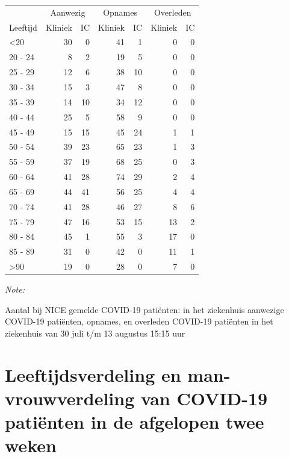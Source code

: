 \documentclass[
  english,
  man,floatsintext]{apa6}
\begin{document}
\begin{table}
\centering\begingroup\fontsize{10}{12}\selectfont

\begin{threeparttable}
\begin{tabular}{lrrrrrr}
\toprule
\multicolumn{1}{c}{ } & \multicolumn{2}{c}{Aanwezig} & \multicolumn{2}{c}{Opnames} & \multicolumn{2}{c}{Overleden} \\
\cmidrule(l{3pt}r{3pt}){2-3} \cmidrule(l{3pt}r{3pt}){4-5} \cmidrule(l{3pt}r{3pt}){6-7}
Leeftijd & Kliniek & IC & Kliniek & IC & Kliniek & IC\\
\midrule
<20 & 30 & 0 & 41 & 1 & 0 & 0\\
20 - 24 & 8 & 2 & 19 & 5 & 0 & 0\\
25 - 29 & 12 & 6 & 38 & 10 & 0 & 0\\
30 - 34 & 15 & 3 & 47 & 8 & 0 & 0\\
35 - 39 & 14 & 10 & 34 & 12 & 0 & 0\\
40 - 44 & 25 & 5 & 58 & 9 & 0 & 0\\
45 - 49 & 15 & 15 & 45 & 24 & 1 & 1\\
50 - 54 & 39 & 23 & 65 & 23 & 1 & 3\\
55 - 59 & 37 & 19 & 68 & 25 & 0 & 3\\
60 - 64 & 41 & 28 & 74 & 29 & 2 & 4\\
65 - 69 & 44 & 41 & 56 & 25 & 4 & 4\\
70 - 74 & 41 & 28 & 46 & 27 & 8 & 6\\
75 - 79 & 47 & 16 & 53 & 15 & 13 & 2\\
80 - 84 & 45 & 1 & 55 & 3 & 17 & 0\\
85 - 89 & 31 & 0 & 42 & 0 & 11 & 1\\
>90 & 19 & 0 & 28 & 0 & 7 & 0\\
\bottomrule
\end{tabular}
\begin{tablenotes}
\item \textit{Note: } 
\item Aantal bij NICE gemelde COVID-19 patiënten: in het ziekenhuis aanwezige COVID-19 patiënten, opnames, en overleden COVID-19 patiënten in het ziekenhuis van 30 juli t/m 13 augustus 15:15 uur
\end{tablenotes}
\end{threeparttable}
\endgroup{}
\end{table}

\newpage

\hypertarget{leeftijdsverdeling-en-man-vrouwverdeling-van-covid-19-patiuxebnten-in-de-afgelopen-twee-weken}{%
\section{Leeftijdsverdeling en man-vrouwverdeling van COVID-19 patiënten in de afgelopen twee weken}\label{leeftijdsverdeling-en-man-vrouwverdeling-van-covid-19-patiuxebnten-in-de-afgelopen-twee-weken}}
\end{document}
